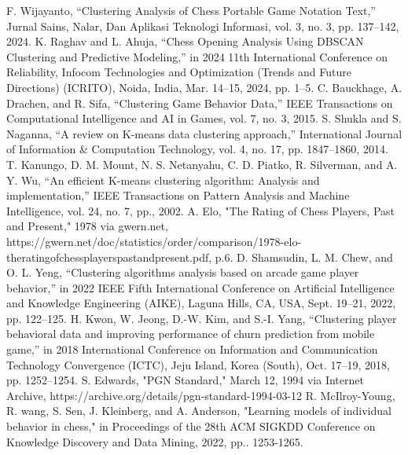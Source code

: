 \documentclass[conference]{IEEEtran}
\begin{document}

\begin{thebibliography}{00}
 F. Wijayanto, “Clustering Analysis of Chess Portable Game Notation Text,” Jurnal Sains, Nalar, Dan Aplikasi Teknologi Informasi, vol. 3, no. 3, pp. 137–142, 2024.
K. Raghav and L. Ahuja, “Chess Opening Analysis Using DBSCAN Clustering and Predictive Modeling,” in 2024 11th International Conference on Reliability, Infocom Technologies and Optimization (Trends and Future Directions) (ICRITO), Noida, India, Mar. 14–15, 2024, pp. 1–5.
 C. Bauckhage, A. Drachen, and R. Sifa, “Clustering Game Behavior Data,” IEEE Transactions on Computational Intelligence and AI in Games, vol. 7, no. 3, 2015.
 S. Shukla and S. Naganna, “A review on K-means data clustering approach,” International Journal of Information \& Computation Technology, vol. 4, no. 17, pp. 1847–1860, 2014.
 T. Kanungo, D. M. Mount, N. S. Netanyahu, C. D. Piatko, R. Silverman, and A. Y. Wu, “An efficient K-means clustering algorithm: Analysis and implementation,” IEEE Transactions on Pattern Analysis and Machine Intelligence, vol. 24, no. 7, pp., 2002.
 A. Elo, "The Rating of Chess Players, Past and Present," 1978 via gwern.net, https://gwern.net/doc/statistics/order/comparison/1978-elo-theratingofchessplayerspastandpresent.pdf, p.6.
 D. Shamsudin, L. M. Chew, and O. L. Yeng, “Clustering algorithms analysis based on arcade game player behavior,” in 2022 IEEE Fifth International Conference on Artificial Intelligence and Knowledge Engineering (AIKE), Laguna Hills, CA, USA, Sept. 19–21, 2022, pp. 122–125.
 H. Kwon, W. Jeong, D.-W. Kim, and S.-I. Yang, “Clustering player behavioral data and improving performance of churn prediction from mobile game,” in 2018 International Conference on Information and Communication Technology Convergence (ICTC), Jeju Island, Korea (South), Oct. 17–19, 2018, pp. 1252–1254.
 S. Edwards, "PGN Standard," March 12, 1994 via Internet Archive, https://archive.org/details/pgn-standard-1994-03-12
 R. McIlroy-Young, R. wang, S. Sen, J. Kleinberg, and A. Anderson, "Learning models of individual behavior in chess," in Proceedings of the 28th ACM SIGKDD Conference on Knowledge Discovery and Data Mining, 2022, pp.. 1253-1265.
\end{thebibliography}
\end{document}

